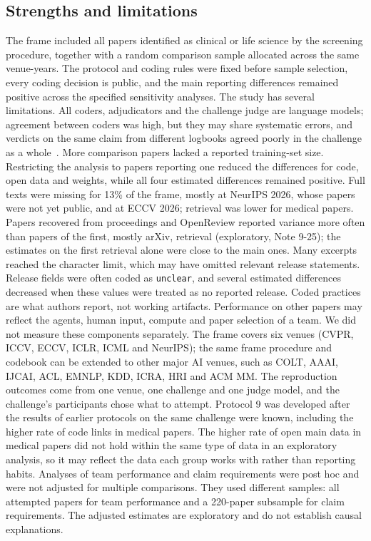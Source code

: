 \documentclass[11pt]{article}
\begin{document}
\subsection*{Strengths and limitations}
The frame included all papers identified as clinical or life science by the screening procedure, together with a random comparison sample allocated across the same venue-years. The protocol and coding rules were fixed before sample selection, every coding decision is public, and the main reporting differences remained positive across the specified sensitivity analyses. The study has several limitations. All coders, adjudicators and the challenge judge are language models; agreement between coders was high, but they may share systematic errors, and verdicts on the same claim from different logbooks agreed poorly in the challenge as a whole~\cite{r13}. More comparison papers lacked a reported training-set size. Restricting the analysis to papers reporting one reduced the differences for code, open data and weights, while all four estimated differences remained positive. Full texts were missing for 13\% of the frame, mostly at NeurIPS 2026, whose papers were not yet public, and at ECCV 2026; retrieval was lower for medical papers. Papers recovered from proceedings and OpenReview reported variance more often than papers of the first, mostly arXiv, retrieval (exploratory, Note 9-25); the estimates on the first retrieval alone were close to the main ones. Many excerpts reached the character limit, which may have omitted relevant release statements. Release fields were often coded as \texttt{unclear}, and several estimated differences decreased when these values were treated as no reported release. Coded practices are what authors report, not working artifacts. Performance on other papers may reflect the agents, human input, compute and paper selection of a team. We did not measure these components separately. The frame covers six venues (CVPR, ICCV, ECCV, ICLR, ICML and NeurIPS); the same frame procedure and codebook can be extended to other major AI venues, such as COLT, AAAI, IJCAI, ACL, EMNLP, KDD, ICRA, HRI and ACM MM. The reproduction outcomes come from one venue, one challenge and one judge model, and the challenge's participants chose what to attempt. Protocol 9 was developed after the results of earlier protocols on the same challenge were known, including the higher rate of code links in medical papers. The higher rate of open main data in medical papers did not hold within the same type of data in an exploratory analysis, so it may reflect the data each group works with rather than reporting habits. Analyses of team performance and claim requirements were post hoc and were not adjusted for multiple comparisons. They used different samples: all attempted papers for team performance and a 220-paper subsample for claim requirements. The adjusted estimates are exploratory and do not establish causal explanations.
\end{document}
